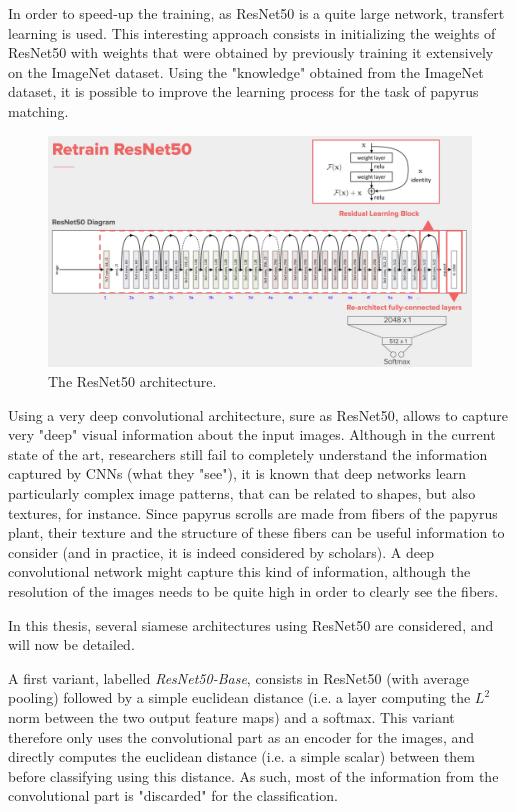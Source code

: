 \documentclass[11pt]{report}
\begin{document}
In order to speed-up the training, as ResNet50 is a quite large network, transfert learning is used. This interesting approach consists in initializing the weights of ResNet50 with weights that were obtained by previously training it extensively on the ImageNet dataset. Using the "knowledge" obtained from the ImageNet dataset, it is possible to improve the learning process for the task of papyrus matching.\newline

\begin{figure}[H]
\centering\includegraphics[width=13cm]{resnet50.png}
\caption{The ResNet50 architecture.}
\label{resnet50}
\end{figure}

Using a very deep convolutional architecture, sure as ResNet50, allows to capture very "deep" visual information about the input images. Although in the current state of the art, researchers still fail to completely understand the information captured by CNNs (what they "see"), it is known that deep networks learn particularly complex image patterns, that can be related to shapes, but also textures, for instance. Since papyrus scrolls are made from fibers of the papyrus plant, their texture and the structure of these fibers can be useful information to consider (and in practice, it is indeed considered by scholars). A deep convolutional network might capture this kind of information, although the resolution of the images needs to be quite high in order to clearly see the fibers.\newline

In this thesis, several siamese architectures using ResNet50 are considered, and will now be detailed.\newline

A first variant, labelled \emph{ResNet50-Base}, consists in ResNet50 (with average pooling) followed by a simple euclidean distance (i.e. a layer computing the $L^2$ norm between the two output feature maps) and a softmax. This variant therefore only uses the convolutional part as an encoder for the images, and directly computes the euclidean distance (i.e. a simple scalar) between them before classifying using this distance. As such, most of the information from the convolutional part is "discarded" for the classification.
\end{document}
